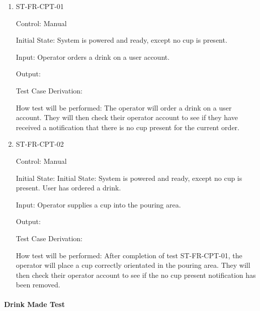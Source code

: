 \documentclass[12pt, titlepage]{article}
\begin{document}
\begin{enumerate}

\item{ST-FR-CPT-01\\}

Control: Manual
					
Initial State: System is powered and ready, except no cup is present.
					
Input: Operator orders a drink on a user account. 
					
Output: %

Test Case Derivation: 
					
How test will be performed: The operator will order a drink on a user account. They will then check their operator account to see if they have received a notification that there is no cup present for the current order.
					
\item{ST-FR-CPT-02\\}

Control: Manual

Initial State: Initial State: System is powered and ready, except no cup is present. User has ordered a drink.

Input: Operator supplies a cup into the pouring area.

Output: 

Test Case Derivation: 

How test will be performed: After completion of test ST-FR-CPT-01, the operator will place a cup correctly orientated in the pouring area. They will then check their operator account to see if the no cup present notification has been removed.

\end{enumerate}

\paragraph{Drink Made Test}
\end{document}
